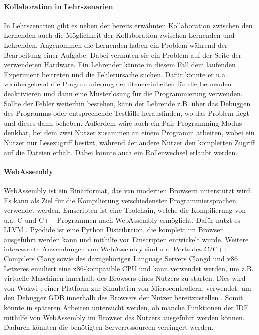 \paragraph{Kollaboration in Lehrszenarien}
In Lehrszenarien gibt es neben der bereits erwähnten Kollaboration zwischen den Lernenden auch die Möglichkeit der Kollaboration zwischen Lernenden und Lehrenden. Angenommen die Lernenden haben ein Problem während der Bearbeitung einer Aufgabe. Dabei vermuten sie ein Problem auf der Seite der verwendeten Hardware. Ein Lehrender könnte in diesem Fall dem laufenden Experiment beitreten und die Fehlerursache suchen. Dafür könnte er u.a. vorübergehend die Programmierung der Steuereinheiten für die Lernenden deaktivieren und dann eine Musterlösung für die Programmierung verwenden. Sollte der Fehler weiterhin bestehen, kann der Lehrende z.B. über das Debuggen des Programms oder entsprechende Testfälle herausfinden, wo das Problem liegt und dieses dann beheben. Außerdem wäre auch ein Pair-Programming Modus denkbar, bei dem zwei Nutzer zusammen an einem Programm arbeiten, wobei ein Nutzer nur Lesezugriff besitzt, während der andere Nutzer den kompletten Zugriff auf die Dateien erhält. Dabei könnte auch ein Rollenwechsel erlaubt werden.

\paragraph{WebAssembly}
WebAssembly \cite{noauthor_webassembly_nodate} ist ein Binärformat, das von modernen Browsern unterstützt wird. Es kann als Ziel für die Kompilierung verschiedenster Programmiersprachen verwendet werden. Emscripten \cite{noauthor_emscripten_nodate} ist eine Toolchain, welche die Kompilierung von u.a. C und C++ Programmen nach WebAssembly ermöglicht. Dafür nutzt es LLVM \cite{noauthor_llvm_nodate}. Pyodide \cite{noauthor_pyodide_nodate} ist eine Python Distribution, die komplett im Browser ausgeführt werden kann und mithilfe von Emscripten entwickelt wurde. Weitere interessante Anwendungen von WebAssembly sind u.a. Ports des C/C++ Compilers Clang \cite{noauthor_clang_nodate}\cite{smith_binjiwasm-clang_2024} sowie des dazugehörigen Language Servers Clangd \cite{noauthor_clangd_nodate}\cite{yu_guyutongxueclangd--browser_2024} und v86 \cite{fabian_copyv86_2025}. Letzeres emuliert eine x86-kompatible CPU und kann verwendet werden, um z.B. virtuelle Maschinen innerhalb des Browsers eines Nutzers zu starten. Dies wird von Wokwi \cite{noauthor_wokwi_nodate}, einer Platform zur Simulation von Microcontrollern, verwendet, um den Debugger GDB innerhalb des Browsers der Nutzer bereitzustellen \cite{noauthor_running_2021}. Somit könnte in späteren Arbeiten untersucht werden, ob manche Funktionen der IDE mithilfe von WebAssembly im Browser des Nutzers ausgeführt werden können. Dadurch könnten die benötigten Serverressourcen verringert werden.